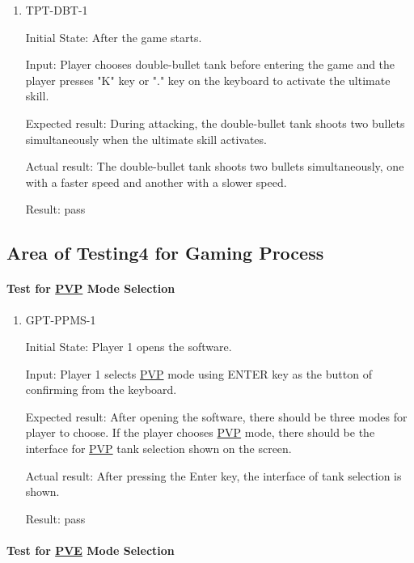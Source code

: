 \documentclass[12pt, titlepage]{article}
\begin{document}
\begin{enumerate}

\item{TPT-DBT-1\\}
					
Initial State: After the game starts.
					
Input: Player chooses double-bullet tank before entering the game and the player presses "K" key or "." key on the keyboard to activate the ultimate skill.
					
Expected result: During attacking, the double-bullet tank shoots two bullets simultaneously when the ultimate skill activates. 
					
Actual result: The double-bullet tank shoots two bullets simultaneously, one with a faster speed and another with a slower speed.

Result: pass

\end{enumerate}

\subsection{Area of Testing4 for Gaming Process}

\paragraph{Test for \underline{PVP} Mode Selection}

\begin{enumerate}

\item{GPT-PPMS-1\\}
					
Initial State: Player 1 opens the software.
					
Input: Player 1 selects \underline{PVP} mode using ENTER key as the button of confirming from the keyboard.
					
Expected result: After opening the software, there should be three modes for player to choose. If the player chooses \underline{PVP} mode, there should be the interface for \underline{PVP} tank selection shown on the screen. 
					
Actual result: After pressing the Enter key, the interface of tank selection is shown.

Result: pass

\end{enumerate}

\paragraph{Test for \underline{PVE} Mode Selection}
\end{document}
